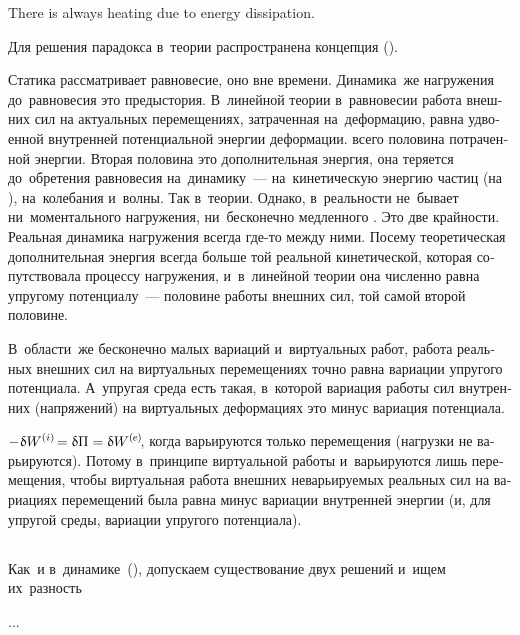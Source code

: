 \begin{otherlanguage}{russian}
There is always heating due to energy dissipation.

Для решения парадокса в~теории распространена концепция  ().

{\small
Статика рассматривает  равновесие, оно вне времени. Динамика~же нагружения до~равновесия это предыстория. В~линейной теории в~равновесии работа внешних сил на актуальных перемещениях, затраченная на~деформацию, равна удвоенной внутренней потенциальной энергии деформации.  всего половина потраченной энергии. Вторая половина это дополнительная энергия, она теряется до~обретения равновесия на~динамику~--- на~кинетическую энергию частиц (на ), на~колебания и~волны. Так в~теории. Однако, в~реальности не~бывает ни~моментального  нагружения, ни~бесконечно медленного . Это две крайности. Реальная динамика нагружения всегда где\hbox{-}то между ними. Посему теоретическая дополнительная энергия всегда больше той реальной  кинетической, которая сопутствовала процессу нагружения, и~в~линейной теории она численно равна упругому потенциалу~--- половине работы внешних сил, той самой второй половине.

В~области~же бесконечно малых вариаций и~виртуальных работ, работа реальных внешних сил на виртуальных перемещениях точно равна вариации упругого потенциала. А~упругая среда есть такая, в~которой вариация работы сил внутренних (напряжений) на виртуальных деформациях это минус вариация потенциала.

${- \hspace{.1ex} \variation{\internalwork} \hspace{-0.2ex} = \variation{\Pi} = \variation{\externalwork} \hspace{-0.25ex}}$, когда варьируются только перемещения (нагрузки не варьируются). Потому в~принципе виртуальной работы и~варьируются лишь перемещения, чтобы виртуальная работа внешних неварьируемых реальных сил на вариациях перемещений была равна минус вариации внутренней энергии (и, для упругой среды, вариации упругого потенциала).
\par}

\subsection*{}

Как~и в~динамике~(), допускаем существование двух решений и~ищем их~разность

...

\end{otherlanguage}


